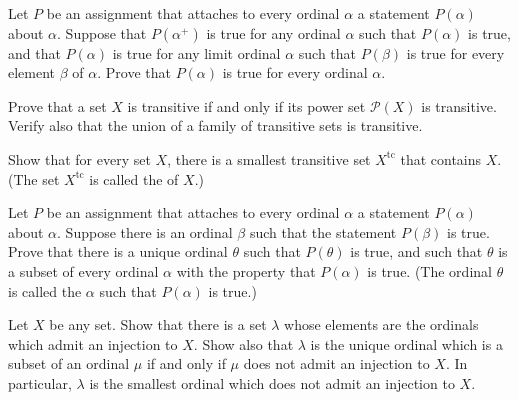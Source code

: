 \documentclass{article}
\begin{document}
\begin{exercise}
  \label{exe:h8nv276e}
  Let \(P\) be an assignment that attaches to every ordinal \(\alpha\)
  a statement \(P(\alpha)\) about \(\alpha\).  Suppose that
  \(P(\alpha^+)\) is true for any ordinal \(\alpha\) such that
  \(P(\alpha)\) is true, and that \(P(\alpha)\) is true for any limit
  ordinal \(\alpha\) such that \(P(\beta)\) is true for every element
  \(\beta\) of \(\alpha\).  Prove that \(P(\alpha)\) is true for every
  ordinal \(\alpha\).
\end{exercise}

\begin{exercise}
  \label{exe:565zdnmj}
  Prove that a set \(X\) is transitive if and only if its power set
  \(\mathcal{P}(X)\) is transitive.  Verify also that the union of a
  family of transitive sets is transitive.
\end{exercise}

\begin{exercise}
  \label{exe:v7uvzogi}
  Show that for every set \(X\), there is a smallest transitive set
  \(X^{\mathrm{tc}}\) that contains \(X\).  (The set
  \(X^{\mathrm{tc}}\) is called the  of
  \(X\).)
\end{exercise}

\begin{exercise}
  \label{exe:zgqzqjo2}
  Let \(P\) be an assignment that attaches to every ordinal \(\alpha\)
  a statement \(P(\alpha)\) about \(\alpha\).  Suppose there is an
  ordinal \(\beta\) such that the statement \(P(\beta)\) is true.
  Prove that there is a unique ordinal \(\theta\) such that
  \(P(\theta)\) is true, and such that \(\theta\) is a subset of every
  ordinal \(\alpha\) with the property that \(P(\alpha)\) is true.
  (The ordinal \(\theta\) is called the 
  \(\alpha\) such that \(P(\alpha)\) is true.)
\end{exercise}

\begin{exercise}
  \label{exe:qqhmi7in}
  Let \(X\) be any set.  Show that there is a set \(\lambda\) whose
  elements are the ordinals which admit an injection to \(X\).  Show
  also that \(\lambda\) is the unique ordinal which is a subset of an
  ordinal \(\mu\) if and only if \(\mu\) does not admit an injection
  to \(X\).  In particular, \(\lambda\) is the smallest ordinal which
  does not admit an injection to \(X\).
\end{exercise}
\end{document}
